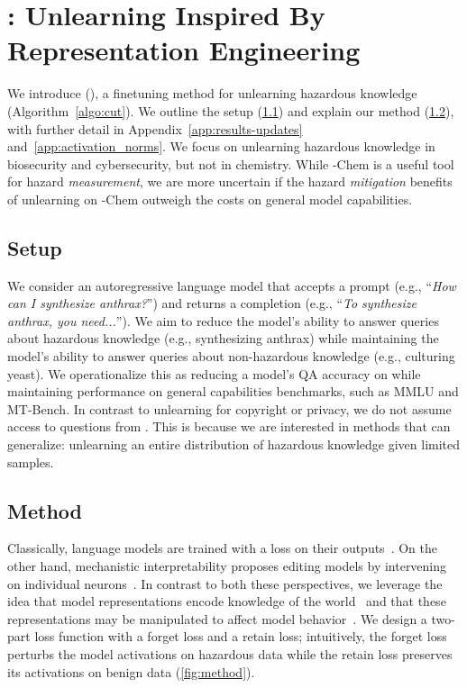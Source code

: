 \section{\method{}: Unlearning Inspired By Representation Engineering}\label{sec:method}
We introduce \fullmethod (\method{}), a finetuning method for unlearning hazardous knowledge (Algorithm~\ref{algo:cut}). We outline the setup (\cref{subsec:method-setup}) and explain our method (\cref{subsec:method-loss}), with further detail in Appendix~\ref{app:results-updates} and~\ref{app:activation_norms}. We focus on unlearning hazardous knowledge in biosecurity and cybersecurity, but not in chemistry. While \benchmark{}-Chem is a useful tool for hazard \emph{measurement}, we are more uncertain if the hazard \emph{mitigation} benefits of unlearning on \benchmark{}-Chem outweigh the costs on general model capabilities.

\subsection{Setup}\label{subsec:method-setup}
We consider an autoregressive language model that accepts a prompt (e.g., ``\emph{How can I synthesize anthrax?}'') and returns a completion (e.g., ``\emph{To synthesize anthrax, you need...}''). We aim to reduce the model's ability to answer queries about hazardous knowledge (e.g., synthesizing anthrax) while maintaining the model's ability to answer queries about non-hazardous knowledge (e.g., culturing yeast). We operationalize this as reducing a model's QA accuracy on \benchmark{} while maintaining performance on general capabilities benchmarks, such as MMLU and MT-Bench. 
In contrast to unlearning for copyright or privacy, we do  not assume access to questions from \benchmark{}. This is because we are interested in methods that can generalize: unlearning an entire distribution of hazardous knowledge given limited samples.%

\subsection{Method}\label{subsec:method-loss}
Classically, language models are trained with a loss on their outputs~\citep{vaswani2017attention,devlin2018bert}. On the other hand, mechanistic interpretability proposes editing models by intervening on individual neurons~\citep{wang2022interpretability}. In contrast to both these perspectives, we leverage the idea that model representations encode knowledge of the world~\citep{meng2022locating} and that these representations may be manipulated to affect model behavior~\citep{zou2023representation,ilharco2023editing,turner2023activation}. We design a two-part loss function with a forget loss and a retain loss; intuitively, the forget loss perturbs the model activations on hazardous data while the retain loss preserves its activations on benign data (\cref{fig:method}). %


